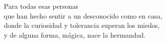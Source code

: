 \cleardoublepage
{}
{}
\begin{flushright}
Para todas esas personas\\
que han hecho sentir a un desconocido como en casa,\\
donde la curiosidad y tolerancia superan los miedos,\\
y de alguna forma, mágica, nace la hermandad.
\end{flushright}

\newpage